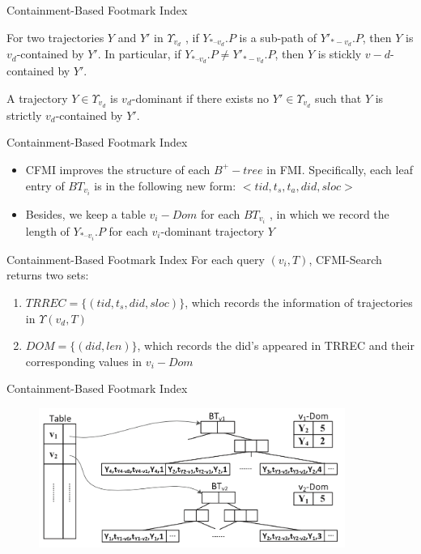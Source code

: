 \documentclass[mathserif]{beamer}
\begin{document}
\begin{frame}{Containment-Based Footmark Index}
\begin{defination}
For two trajectories $Y$ and $Y'$ in $\Upsilon{}_{v_d}$ , if $Y_{*–v_d}.P$ is a sub-path of $Y'_{*-v_d}.P$, then $Y$ is $v_d$-contained by $Y'$. In particular, if $Y_{*–v_d}.P \neq{} Y'_{*-v_d}.P $, then $Y$ is stickly $v-d$-contained by $Y'$.
\end{defination}
\begin{defination}
A trajectory $Y \in{} \Upsilon{}_{v_d}$ is $v_d$-dominant if there exists no $Y' \in{} Υ_{v_d}$ such that $Y$ is strictly $v_d$-contained by $Y'$.
\end{defination}
\end{frame}

\begin{frame}{Containment-Based Footmark Index}
	\begin{itemize}
	\item CFMI improves the structure of each $B^+-tree$ in FMI. Specifically, each leaf entry of $BT_{v_i}$ is in the following new form: $<tid,t_s,t_a,did,sloc>$
	\item Besides, we keep a table $v_i-Dom$ for each $BT_{v_i}$ , in which we record the length of $Y_{*–v_i}.P$ for each $v_i$-dominant trajectory $Y$
	\end{itemize}
\end{frame}

\begin{frame}{Containment-Based Footmark Index}
	For each query $(v_i, T)$, CFMI-Search returns two sets:
		\begin{enumerate}
		\item $TRREC =\{(tid, t_s , did, sloc)\}$, which records the information of trajectories in $\Upsilon{}(v_d ,T )$
		\item $DOM = \{(did, len)\}$, which records the did’s appeared in TRREC and their corresponding values in $v_i - Dom$ 
		\end{enumerate}
\end{frame}

\begin{frame}{Containment-Based Footmark Index}
\begin{figure}
\includegraphics[width = 10cm]{CFMI.png}
\end{figure}
\end{frame}
\end{document}
